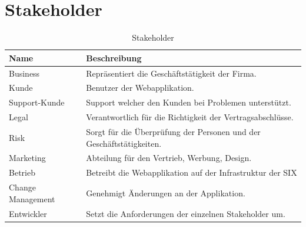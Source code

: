 \section{Stakeholder}

\begin{table}[H]
	\centering
	\caption{Stakeholder}
	\begin{tabular}{ | p{3cm} | p{13cm} | }
		\toprule
		{\textbf{Name}} & {\textbf{Beschreibung}} \\
		\midrule
		Business & Repräsentiert die Geschäftstätigkeit der Firma.\\ \hline
		Kunde & Benutzer der Webapplikation. \\ \hline
		Support-Kunde & Support welcher den Kunden bei Problemen unterstützt. \\ \hline
		Legal &  Verantwortlich für die Richtigkeit der Vertragsabschlüsse. \\ \hline
		Risk & Sorgt für die Überprüfung der Personen und der Geschäftstätigkeiten. \\ \hline
		Marketing & Abteilung für den Vertrieb, Werbung, Design. \\ \hline
		Betrieb & Betreibt die Webapplikation auf der Infrastruktur der SIX \\ \hline
		Change Management & Genehmigt Änderungen an der Applikation. \\ \hline
		Entwickler & Setzt die Anforderungen der einzelnen Stakeholder um. \\
		\bottomrule
	\end{tabular}
\end{table}
